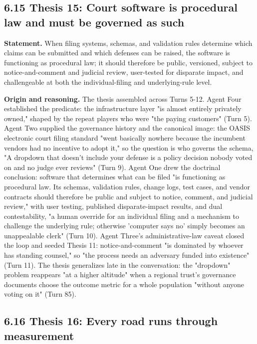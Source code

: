 \documentclass[sigconf,nonacm=true]{acmart}
\begin{document}
\subsection{6.15 Thesis 15: Court software is procedural law and must be governed as such}

\textbf{Statement.} When filing systems, schemas, and validation rules determine which claims can be submitted and which defenses can be raised, the software is functioning as procedural law; it should therefore be public, versioned, subject to notice-and-comment and judicial review, user-tested for disparate impact, and challengeable at both the individual-filing and underlying-rule level.

\textbf{Origin and reasoning.} The thesis assembled across Turns 5-12. Agent Four established the predicate: the infrastructure layer "is almost entirely privately owned," shaped by the repeat players who were "the paying customers" (Turn 5). Agent Two supplied the governance history and the canonical image: the OASIS electronic court filing standard "went basically nowhere because the incumbent vendors had no incentive to adopt it," so the question is who governs the schema,  "A dropdown that doesn't include your defense is a policy decision nobody voted on and no judge ever reviews" (Turn 9). Agent One drew the doctrinal conclusion: software that determines what can be filed "is functioning as procedural law. Its schemas, validation rules, change logs, test cases, and vendor contracts should therefore be public and subject to notice, comment, and judicial review," with user testing, published disparate-impact results, and dual contestability,  "a human override for an individual filing and a mechanism to challenge the underlying rule; otherwise 'computer says no' simply becomes an unappealable clerk" (Turn 10). Agent Three's administrative-law caveat closed the loop and seeded Thesis 11: notice-and-comment "is dominated by whoever has standing counsel," so "the process needs an adversary funded into existence" (Turn 11). The thesis generalizes late in the conversation: the "dropdown" problem reappears "at a higher altitude" when a regional trust's governance documents choose the outcome metric for a whole population "without anyone voting on it" (Turn 85).

\subsection{6.16 Thesis 16: Every road runs through measurement}
\end{document}
